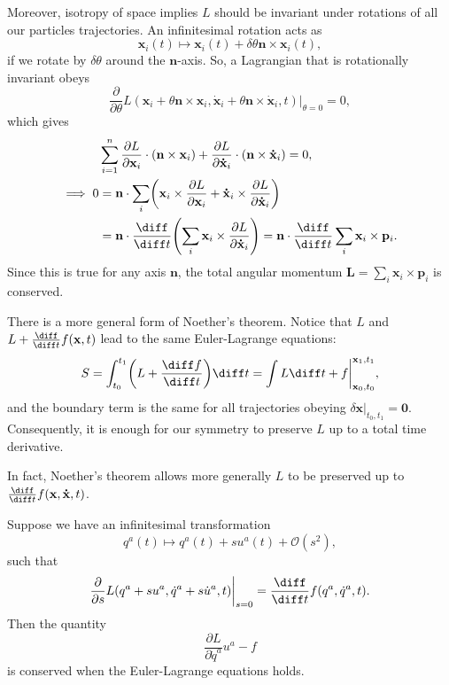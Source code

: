 \documentclass[12pt]{article}
\begin{document}
Moreover, isotropy of space implies $L$ should be invariant under rotations of all our particles trajectories. An infinitesimal rotation acts as
\[
\mathbf{x}_i(t) \mapsto \mathbf{x}_i(t) + \delta \theta \mathbf{n} \times \mathbf{x}_i(t),
\]
if we rotate by $\delta \theta$ around the $\mathbf{n}$-axis. So, a Lagrangian that is rotationally invariant obeys
\[
\frac{\partial}{\partial \theta} L(\mathbf{x}_i + \theta \mathbf{n} \times \mathbf{x}_i, \mathbf{\dot x}_i + \theta \mathbf{n} \times \mathbf{\dot x}_i, t) \biggr|_{\theta = 0} = 0,
\]
which gives
\begin{align*}
	&\sum_{i = 1}^{n} \frac{\partial L}{\partial \mathbf{x}_i} \cdot (\mathbf{n} \times \mathbf{x}_i) + \frac{\partial L}{\partial \mathbf{\dot x}_i} \cdot (\mathbf{n} \times \mathbf{\dot x}_i) = 0, \\
	\implies 0 &= \mathbf{n} \cdot \sum_i \biggl( \mathbf{x}_i \times \frac{\partial L}{\partial \mathbf{x}_i} + \mathbf{\dot x}_i \times \frac{\partial L}{\partial \mathbf{\dot x}_i} \biggr) \\
		   &= \mathbf{n} \cdot \frac{\diff}{\diff t} \Biggl( \sum_{i} \mathbf{x}_i \times \frac{\partial L}{\partial \mathbf{\dot x}_i} \Biggr) = \mathbf{n} \cdot \frac{\diff}{\diff t} \sum_i \mathbf{x}_i \times \mathbf{p}_i.
\end{align*}
Since this is true for any axis $\mathbf{n}$, the total angular momentum $\mathbf{L} = \sum_i \mathbf{x}_i \times \mathbf{p}_i$ is conserved.

There is a more general form of Noether's theorem. Notice that $L$ and $L + \frac{\diff}{\diff t} f(\mathbf{x}, t)$ lead to the same Euler-Lagrange equations:
\[
S = \int_{t_0}^{t_1} \biggl( L + \frac{\diff f}{\diff t} \biggr) \diff t = \int L \diff t + f \biggr|_{\mathbf{x}_0, t_0}^{\mathbf{x}_1, t_1},
\]
and the boundary term is the same for all trajectories obeying $\delta \mathbf{x}|_{t_0, t_1} = \mathbf{0}$. Consequently, it is enough for our symmetry to preserve $L$ up to a total time derivative.

In fact, Noether's theorem allows more generally $L$ to be preserved up to $\frac{\diff}{\diff t}f(\mathbf{x}, \mathbf{\dot x}, t)$.

\begin{theorem}
	Suppose we have an infinitesimal transformation
	\[
	q^a(t) \mapsto q^a(t) + s u^a(t) + \mathcal{O}(s^2),
	\]
	such that
	\[
	\frac{\partial}{\partial s} L(q^a + s u^a, \dot q^a + s \dot u^a, t) \biggr|_{s=0} = \frac{\diff}{\diff t} f(q^a, \dot q^a, t).
	\]
	Then the quantity
	\[
	\frac{\partial L}{\partial \dot q^a} u^a - f
	\]
	is conserved when the Euler-Lagrange equations holds.
\end{theorem}
\end{document}
